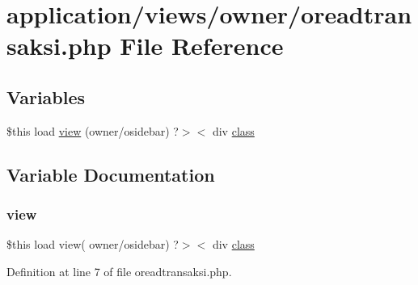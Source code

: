 \hypertarget{oreadtransaksi_8php}{}\section{application/views/owner/oreadtransaksi.php File Reference}
\label{oreadtransaksi_8php}
\subsection*{Variables}
\begin{DoxyCompactItemize}
\item 
\$this load \mbox{\hyperlink{oreadtransaksi_8php_a2538803aad41a255ee26d781157c17b3}{view}} (\textquotesingle{}owner/osidebar\textquotesingle{}) ?$>$$<$ div \mbox{\hyperlink{waiter_2olaporan_8php_a185c73c6507391d1eb38c776b68ce96d}{class}}
\end{DoxyCompactItemize}


\subsection{Variable Documentation}
\mbox{\label{oreadtransaksi_8php_a2538803aad41a255ee26d781157c17b3}} 
\subsubsection{\texorpdfstring{view}{view}}
{\footnotesize\ttfamily \$this load view( \textquotesingle{}owner/osidebar\textquotesingle{}) ?$>$$<$ div \mbox{\hyperlink{waiter_2olaporan_8php_a185c73c6507391d1eb38c776b68ce96d}{class}}}



Definition at line 7 of file oreadtransaksi.\+php.

